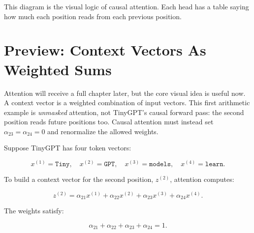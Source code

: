 \begin{center}
\end{center}

This diagram is the visual logic of causal attention. Each head has a table saying how much each position reads from each previous position.

\section{Preview: Context Vectors As Weighted Sums}

Attention will receive a full chapter later, but the core visual idea is useful now.
A context vector is a weighted combination of input vectors. This first arithmetic
example is \emph{unmasked} attention, not TinyGPT's causal forward pass: the second
position reads future positions too. Causal attention must instead set
\(\alpha_{23}=\alpha_{24}=0\) and renormalize the allowed weights.

Suppose TinyGPT has four token vectors:

\[
x^{(1)}=\texttt{Tiny},\quad
x^{(2)}=\texttt{GPT},\quad
x^{(3)}=\texttt{models},\quad
x^{(4)}=\texttt{learn}.
\]

To build a context vector for the second position, \(z^{(2)}\), attention computes:

\[
z^{(2)} =
\alpha_{21}x^{(1)}
+ \alpha_{22}x^{(2)}
+ \alpha_{23}x^{(3)}
+ \alpha_{24}x^{(4)}.
\]

The weights satisfy:

\[
\alpha_{21}+\alpha_{22}+\alpha_{23}+\alpha_{24}=1.
\]

